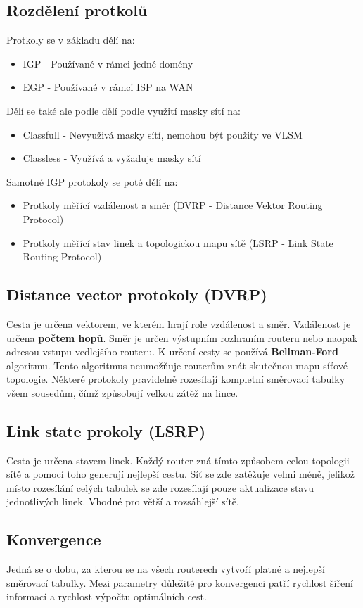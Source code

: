 \subsection{Rozdělení protkolů}
Protkoly se v základu dělí na:
\begin{itemize}
    \item IGP - Používané v rámci jedné domény
    \item EGP - Používané v rámci ISP na WAN
\end{itemize}
Dělí se také ale podle dělí podle využití masky sítí na:
\begin{itemize}
    \item Classfull - Nevyuživá masky sítí, nemohou být použity ve VLSM
    \item Classless - Využívá a vyžaduje masky sítí
\end{itemize}
Samotné IGP protokoly se poté dělí na:
\begin{itemize}
    \item Protkoly měřící vzdálenost a směr (DVRP - Distance Vektor Routing Protocol)
    \item Protkoly měřící stav linek a topologickou mapu sítě (LSRP - Link State Routing Protocol)
\end{itemize}
\subsection{Distance vector protokoly (DVRP)}
Cesta je určena vektorem, ve kterém hrají role vzdálenost a směr.
Vzdálenost je určena \textbf{počtem hopů}.
Směr je určen výstupním rozhraním routeru nebo naopak adresou vstupu vedlejšího routeru.
K určení cesty se používá \textbf{Bellman-Ford} algoritmu.
Tento algoritmus neumožňuje routerům znát skutečnou mapu síťové topologie.
Některé protokoly pravidelně rozesílají kompletní směrovací tabulky všem sousedům, čímž způsobují velkou zátěž na lince.
\subsection{Link state prokoly (LSRP)}
Cesta je určena stavem linek.
Každý router zná tímto způsobem celou topologii sítě a pomocí toho generují nejlepší cestu.
Síť se zde zatěžuje velmi méně, jelikož místo rozesílání celých tabulek se zde rozesílají pouze aktualizace stavu jednotlivých linek.
Vhodné pro větší a rozsáhlejší sítě.
\subsection{Konvergence}
Jedná se o dobu, za kterou se na všech routerech vytvoří platné a nejlepší směrovací tabulky.
Mezi parametry důležité pro konvergenci patří rychlost šíření informací a rychlost výpočtu optimálních cest.
